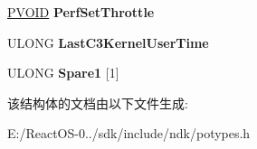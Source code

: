 \begin{DoxyCompactItemize}
\mbox{\label{struct___p_r_o_c_e_s_s_o_r___p_o_w_e_r___s_t_a_t_e_a8421550438048fc93ed316f822150269}} 
\hyperlink{interfacevoid}{P\+V\+O\+ID} {\bfseries Perf\+Set\+Throttle}
\item 
\mbox{\label{struct___p_r_o_c_e_s_s_o_r___p_o_w_e_r___s_t_a_t_e_a44a37d05532fc3724eda83e3f9254d99}} 
U\+L\+O\+NG {\bfseries Last\+C3\+Kernel\+User\+Time}
\item 
\mbox{\label{struct___p_r_o_c_e_s_s_o_r___p_o_w_e_r___s_t_a_t_e_ab4a53120d20d998f1c58ecdb594aa4f6}} 
U\+L\+O\+NG {\bfseries Spare1} \mbox{[}1\mbox{]}
\end{DoxyCompactItemize}


该结构体的文档由以下文件生成\+:\begin{DoxyCompactItemize}
\item 
E\+:/\+React\+O\+S-\/0../sdk/include/ndk/potypes.\+h\end{DoxyCompactItemize}
